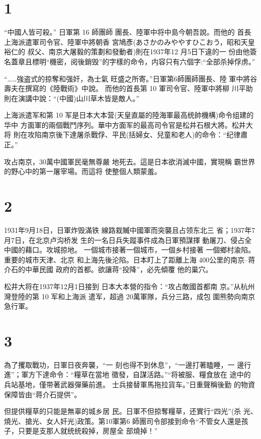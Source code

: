 \documentclass[12pt,UTF8]{ctexbook}
\begin{document}
\section{1}

“中國人皆可殺。” 日軍第 16 師團師
團長、陸軍中将中島今朝吾說。而他的
首長上海派遣軍司令官、陸軍中將朝香
宮鳩彥(あさかのみややすひこおう，昭和天皇裕仁的
叔父、南京大屠毅的策劃和發動者)則在1937年12
月5日下違的一
份由他簽名蓋章且標明“機密，阅後銷毁”的字樣的命令，内容只有六個字:“全部杀掉俘虏。”

“……強盗式的掠奪和强奸，為士氣
旺盛之所寄。”日軍第6師團師團長、陸
軍中將谷壽夫在撰寫的《陸戰術》中說。
而他的首長第 10 軍司令官、陸軍中將柳
川平助則在演講中說：“(中國)山川草木皆是敵人。”

上海派遣军和第 10 军是日本大本营(天皇直屬的陸海軍最高统帥機構)命令组建的华中
方面軍的兩個戰鬥序列。華中方面军的最高司令官是松井石根大將。松井大将
則在攻陷南京後下達屠杀戰俘、平民(括婦女、兒童和老人)的命令：“纪律肅正。”

攻占南京，30萬中國軍民毫無尊嚴
地死去。這是日本欲消滅中國，實現稱
霸世界的野心中的第一屠宰場。而這将
使整個人類蒙羞。

\section{2}

1931年9月18日，日軍炸毁滿铁
線路栽贓中國軍而突襲且占领东北三
省；1937年7月7日，在北京卢沟桥发
生的一名日兵失蹤事件成為日軍預謀揮
動屠刀、侵占全中國的藉口。攻城掠地。
一個城市接著一個城市，一個乡村接著
一個鄉村渝陷。重要的城市天津、北京
和上海先後沦陷。日本盯上了距離上海
400公里的南京--蒋介石的中華民國
政府的首都。欲讓蒋“投降”，必先傾覆
他的巢穴。

松井大将在1937年12月1日接到
日本大本營的指令：“攻占敵國首都南
京。”从杭州灣登陸的第 10 军和上海派
遣军，超過 20萬軍隊，兵分三路，成包
圍熊勢向南京急行軍。

\section{3}

為了攫取戰功，日軍日夜奔襲，“一
刻也得不到休息”，“一邊打著瞌睡，一
邊行進”；軍方下達命令：“糧草在當地
徵發，自謀活路。”“将被服、糧食放在
途中的兵站基地，僅带著武器彈藥前進。
士兵接替軍馬拖拉貨车。”日重聲稱後勤
的物資保障皆由“蒋介石提供”。

但提供糧草的只能是無辜的城乡居
民。日軍不但掠奪糧草，还實行“四光”(杀
光、燒光、搶光、女人奸光)政策。第10軍第6
師團司令部接到命令“不管女人還是孩
子，只要是支那人就统统殺掉，房屋全
部燒掉！”
\end{document}
